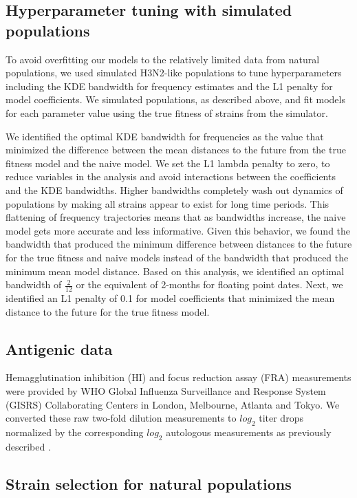 \documentclass[9pt,lineno]{elife} %
\providecommand{\DIFaddbegin}{} %
\providecommand{\DIFaddend}{} %
\providecommand{\DIFdelbegin}{} %
\providecommand{\DIFdelend}{} %
\providecommand{\DIFaddbegin}{} %
\providecommand{\DIFaddend}{} %
\providecommand{\DIFdelbegin}{} %
\providecommand{\DIFdelend}{} %
\newcommand{\DIFscaledelfig}{0.5}
\newlength{\DIFdelgraphicswidth} %
\newlength{\DIFdelgraphicsheight} %
\newcommand{\DIFaddincludegraphics}[2][]{{\color{blue}\fbox{\DIFOincludegraphics[#1]{#2}}}} %
\newcommand{\DIFdelincludegraphics}[2][]{%
\sbox{\DIFdelgraphicsbox}{\DIFOincludegraphics[#1]{#2}}%
\settoboxwidth{\DIFdelgraphicswidth}{\DIFdelgraphicsbox} %
\settoboxtotalheight{\DIFdelgraphicsheight}{\DIFdelgraphicsbox} %
\scalebox{\DIFscaledelfig}{%
\parbox[b]{\DIFdelgraphicswidth}{\usebox{\DIFdelgraphicsbox}\\[-\baselineskip] \rule{\DIFdelgraphicswidth}{0em}}\llap{\resizebox{\DIFdelgraphicswidth}{\DIFdelgraphicsheight}{%
\setlength{\unitlength}{\DIFdelgraphicswidth}%
\begin{picture}(1,1)%
\thicklines\linethickness{2pt} %
{\color[rgb]{1,0,0}\put(0,0){\framebox(1,1){}}}%
{\color[rgb]{1,0,0}\put(0,0){\line( 1,1){1}}}%
{\color[rgb]{1,0,0}\put(0,1){\line(1,-1){1}}}%
\end{picture}%
}\hspace*{3pt}}} %
} %
\DeclareRobustCommand{\DIFaddbegin}{\DIFOaddbegin \let\includegraphics\DIFaddincludegraphics} %
\DeclareRobustCommand{\DIFaddend}{\DIFOaddend \let\includegraphics\DIFOincludegraphics} %
\DeclareRobustCommand{\DIFdelbegin}{\DIFOdelbegin \let\includegraphics\DIFdelincludegraphics} %
\DeclareRobustCommand{\DIFdelend}{\DIFOaddend \let\includegraphics\DIFOincludegraphics} %
\begin{document}
\DIFaddend \subsection*{Hyperparameter tuning with simulated populations}

To avoid overfitting our models to the relatively limited data from natural populations, we used simulated H3N2-like populations to tune hyperparameters including the KDE bandwidth for frequency estimates and the L1 penalty for model coefficients.
We simulated populations, as described above, and fit models for each parameter value using the true fitness of strains from the simulator.

We identified the optimal KDE bandwidth for frequencies as the value that minimized the difference between the mean distances to the future from the true fitness model and the naive model.
We set the L1 lambda penalty to zero, to reduce variables in the analysis and avoid interactions between the coefficients and the KDE bandwidths.
Higher bandwidths completely wash out dynamics of populations by making all strains appear to exist for long time periods.
This flattening of frequency trajectories means that as bandwidths increase, the naive model gets more accurate and less informative.
Given this behavior, we found the bandwidth that produced the minimum difference between distances to the future for the true fitness and naive models instead of the bandwidth that produced the minimum mean model distance.
Based on this analysis, we identified an optimal bandwidth of $\frac{2}{12}$ or the equivalent of 2-months for floating point dates.
Next, we identified an L1 penalty of 0.1 for model coefficients that minimized the mean distance to the future for the true fitness model.

\subsection*{Antigenic data}

Hemagglutination inhibition (HI) and focus reduction assay (FRA) measurements were provided by WHO Global Influenza Surveillance and Response System (GISRS) Collaborating Centers in London, Melbourne, Atlanta and Tokyo.
We converted these raw two-fold dilution measurements to $log_{2}$ titer drops normalized by the corresponding $log_{2}$ autologous measurements as previously described \DIFdelbegin %
\DIFdelend \DIFaddbegin \citep{Neher:2016hy}\DIFaddend .

\subsection*{Strain selection for natural populations}
\end{document}
